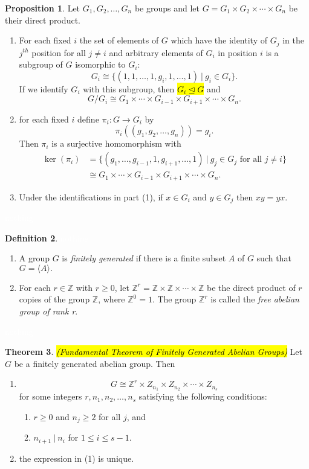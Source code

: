 \documentclass{article}
\theoremstyle{definition}
\newtheorem{thm}{Theorem}[section]
\newtheorem{prop}[thm]{Proposition}
\newtheorem{defn}[thm]{Definition}
\newcommand{\nl}{\textcolor{white}{nothing}}
\newcommand{\ra}{\rightarrow}
\newcommand{\Z}{\mathbb{Z}}
\begin{document}
\begin{prop}
Let $G_1, G_2, \ldots, G_n$ be groups and let $G = G_1\times G_2\times \cdots\times G_n$ be their direct product.
\begin{enumerate}
\item For each fixed $i$ the set of elements of $G$ which have the identity of $G_j$ in the $j^{th}$ position for all $j\neq i$ and arbitrary elements of $G_i$ in position $i$ is a subgroup of $G$ isomorphic to $G_i$:
\[G_i \cong \{(1,1,\ldots,1,g_i,1,\ldots,1)\ |\ g_i\in G_i\}.\]
If we identify $G_i$ with this subgroup, then \hl{$G_i \unlhd G$} and 
\[G/G_i\cong G_1\times\cdots\times G_{i-1}\times G_{i+1}\times \cdots\times G_n.\]
\item for each fixed $i$ define $\pi_i:G\ra G_i$ by
\[\pi_i((g_1,g_2,\ldots,g_n)) = g_i.\]
Then $\pi_i$ is a surjective homomorphism with
\begin{align*}
\ker(\pi_i) &= \{(g_1,\ldots,g_{i-1},1,g_{i+1},\ldots,1)\ |\ g_j\in G_j\text{ for all } j\neq i\}\\
&\cong G_1\times\cdots\times G_{i-1}\times G_{i+1}\times \cdots\times G_n.
\end{align*}
\item Under the identifications in part (1), if $x\in G_i$ and $y\in G_j$ then $xy = yx$.
\end{enumerate}
\end{prop}

\nl

\begin{defn}\nl
\begin{enumerate}
\item A group $G$ is \textit{finitely generated} if there is a finite subset $A$ of $G$ such that $G = \langle A\rangle.$
\item For each $r\in \Z$ with $r\geq 0$, let $\Z^r = \Z\times\Z\times\cdots\times\Z$ be the direct product of $r$ copies of the group $\Z$, where $\Z^0 = 1$. The group $\Z^r$ is called the \textit{free abelian group of rank r}.
\end{enumerate}
\end{defn}

\nl

\begin{thm}\hl{\textit{(Fundamental Theorem of Finitely Generated Abelian Groups)}}
Let $G$ be a finitely generated abelian group. Then
\begin{enumerate}
\item 
\[G\cong \Z^r\times Z_{n_1}\times Z_{n_2}\times\cdots\times Z_{n_s}\]
for some integers $r,n_1,n_2,\ldots,n_s$ satisfying the following conditions:
\begin{enumerate}
\item $r\geq 0$ and $n_j \geq 2$ for all $j$, and
\item $n_{i+1}\ |\ n_i$ for $1\leq i\leq s-1$.
\end{enumerate}
\item the expression in (1) is unique.
\end{enumerate}
\end{thm}
\end{document}
